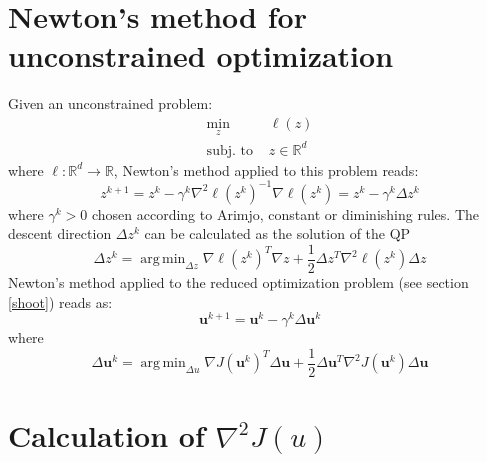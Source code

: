 \documentclass[openany]{book}
\DeclareMathOperator*{\argmin}{arg\,min}  %
\newcommand{\R}{\mathbb{R}}               %
\theoremstyle{definition}
\theoremstyle{remark}
\begin{document}
\section{Newton's method for unconstrained optimization}
Given an unconstrained problem: 
\begin{align*}
    \min_{z} & \ell(z)\\  
    \text{subj. to } & z\in\R^d
\end{align*}
where $\ell:\R^d\to\R$, Newton's method applied to this problem reads:
\[
    z^{k+1} = z^k-\gamma^k\nabla^2\ell(z^k)^{-1}\nabla \ell(z^k) = z^k-\gamma^k\Delta z^k
\]
where $\gamma^k>0$ chosen according to Arimjo, constant or diminishing rules. The descent direction $\Delta z^k$ can be calculated as the solution of the QP 
\[
    \Delta z^k = \argmin_{\Delta z}\nabla\ell(z^k)^T\nabla z + \displaystyle\frac{1}{2} \Delta z^T\nabla^2\ell(z^k)\Delta z
\]
Newton's method applied to the reduced optimization problem (see section \ref{shoot}) reads as: 
\[
    \mathbf{u}^{k+1} = \mathbf{u}^k - \gamma^k \Delta\mathbf{u}^k
\]
where 
\[
    \Delta\mathbf{u}^k = \argmin_{\Delta u} \nabla J(\mathbf{u}^k)^T \Delta\mathbf{u} + \displaystyle\frac{1}{2}\Delta \mathbf{u}^T\nabla^2J(\mathbf{u}^k)\Delta\mathbf{u}
\]
\section{Calculation of \texorpdfstring{$\nabla^2J(u)$}{Calculation of the Hessian of J(u)}}
\end{document}
